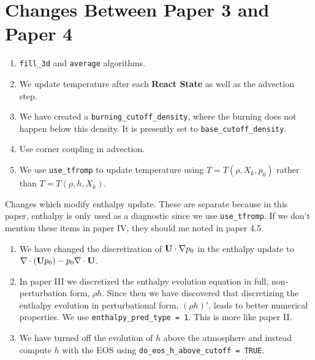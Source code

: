 \section{Changes Between Paper 3 and Paper 4}
\begin{enumerate}
\item {\tt fill\_3d} and {\tt average} algorithms.
\item We update temperature after each {\bf React State} as well as the advection step.
\item We have created a {\tt burning\_cutoff\_density}, where the burning does
not happen below this density.  It is presently set to {\tt base\_cutoff\_density}.
\item Use corner coupling in advection.
\item We use {\tt use\_tfromp} to update temperature using $T=T(\rho,X_k,p_0)$ rather 
than $T=T(\rho,h,X_k)$.
\end{enumerate}
Changes which modify enthalpy update.  These are separate because in this paper,
enthalpy is only used as a diagnostic since we use {\tt use\_tfromp}.  If we don't
mention these items in paper IV, they should me noted in paper 4.5.
\begin{enumerate}
\item We have changed the discretization of ${\bf U}\cdot\nabla p_0$ in the enthalpy
update to $\nabla\cdot({\bf U} p_0) - p_0\nabla\cdot{\bf U}$.
\item In paper III we discretized the enthalpy evolution equation in
full, non-perturbation form, $\rho h$.  Since then we have discovered that 
discretizing the enthalpy evolution in perturbational form, $(\rho h)'$,
leads to better numerical properties.  We use {\tt enthalpy\_pred\_type = 1}.
This is more like paper II.
\item We have turned off the evolution of $h$ above the atmosphere and instead
compute $h$ with the EOS using {\tt do\_eos\_h\_above\_cutoff = TRUE}.
\end{enumerate}
